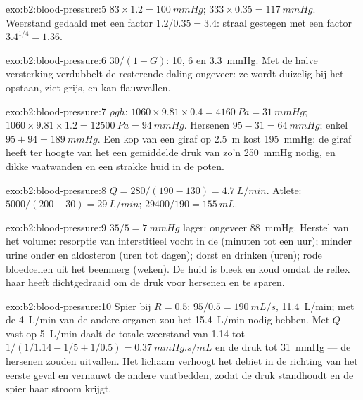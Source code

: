 \begin{solution}{exo:b2:blood-pressure:5}
$83\times 1.2 = \qty{100}{mmHg}$; $333\times 0.35 = \qty{117}{mmHg}$.
Weerstand gedaald met een factor $1.2/0.35 = 3.4$: straal gestegen met een
factor $3.4^{1/4} =
1.36$.
\end{solution}

\begin{solution}{exo:b2:blood-pressure:6}
$30/(1 + G)$: 10, 6 en \qty{3.3}{mmHg}. Met de halve versterking verdubbelt
de resterende daling ongeveer: ze wordt duizelig bij het opstaan, ziet grijs,
en kan flauwvallen.
\end{solution}

\begin{solution}{exo:b2:blood-pressure:7}
$\rho g h$: $1060\times 9.81\times 0.4 = \qty{4160}{Pa} =
\qty{31}{mmHg}$; $1060\times 9.81\times 1.2 = \qty{12500}{Pa} =
\qty{94}{mmHg}$. Hersenen $95 - 31 = \qty{64}{mmHg}$; enkel $95 + 94 =
\qty{189}{mmHg}$. Een kop van een giraf op \qty{2.5}{m} kost
\qty{195}{mmHg}: de giraf heeft ter hoogte van het  een gemiddelde druk
van zo'n \qty{250}{mmHg} nodig, en dikke vaatwanden en een strakke huid in
de poten.
\end{solution}

\begin{solution}{exo:b2:blood-pressure:8}
$Q = 280/(190 - 130) = \qty{4.7}{L/min}$. Atlete: $5000/(200 - 30) =
\qty{29}{L/min}$;  $\num{29400}/190 = \qty{155}{mL}$.
\end{solution}

\begin{solution}{exo:b2:blood-pressure:9}
$35/5 = \qty{7}{mmHg}$ lager: ongeveer \qty{88}{mmHg}. Herstel van het
volume: resorptie van interstitieel vocht in de  (minuten tot een
uur); minder urine onder  en aldosteron (uren tot
dagen); dorst en drinken (uren); rode bloedcellen uit het beenmerg (weken). De
huid is bleek en koud omdat de reflex haar  heeft dichtgedraaid om
de druk voor hersenen en  te sparen.
\end{solution}

\begin{solution}{exo:b2:blood-pressure:10}
Spier bij $R = 0.5$: $95/0.5 = \qty{190}{mL/s}$, \qty{11.4}{L/min};
met de \qty{4}{L/min} van de andere organen zou het 
\qty{15.4}{L/min} nodig hebben. Met $Q$ vast op \qty{5}{L/min} daalt de totale
weerstand van 1.14 tot $1/(1/1.14 - 1/5 + 1/0.5) =
\qty{0.37}{mmHg.s/mL}$ en de druk tot \qty{31}{mmHg} --- de hersenen zouden
uitvallen. Het lichaam verhoogt het debiet in de richting van het eerste
geval en vernauwt de andere vaatbedden, zodat de druk standhoudt en de spier
haar stroom krijgt.
\end{solution}

